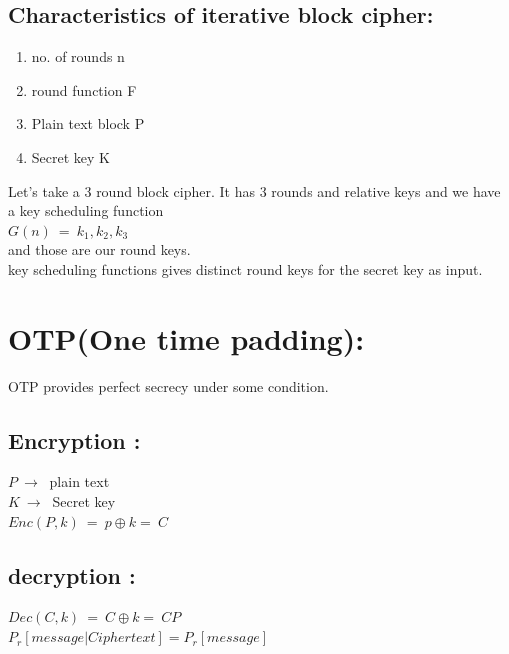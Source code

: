 \documentclass[11pt]{article}
\begin{document}
\subsection{Characteristics of iterative block cipher:}
\begin{enumerate}
    \item no. of rounds n
    \item round function F
    \item Plain text block P
    \item Secret key K
\end{enumerate}

Let's take a 3 round block cipher.
It has 3 rounds and relative keys and we have a key scheduling function \\

$G(n)\ =\ k_1,k_2,k_3$ \\

and those are our round keys.\\
key scheduling functions gives distinct round keys for the secret key as input.


\section{OTP(One time padding):}
OTP provides perfect secrecy under some condition.

\subsection{Encryption :}
$P\ \rightarrow\ $ plain text\\
$K\ \rightarrow\ $ Secret key\\

$Enc(P,k)\ =\ p \oplus k =\ C$

\subsection{decryption :}

$Dec(C,k)\ =\ C \oplus k =\ CP$\\

$P_r[message | Cipher text] = P_r[message]$

\end{document}
